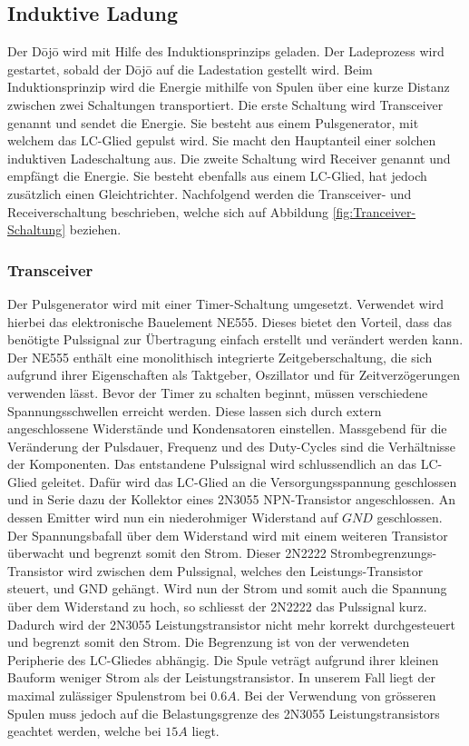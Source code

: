 \subsection{Induktive Ladung}\label{sec:energieuebertragung}

Der Dōjō wird mit Hilfe des Induktionsprinzips geladen. Der Ladeprozess wird gestartet, sobald der Dōjō auf die Ladestation gestellt wird. Beim Induktionsprinzip wird die Energie mithilfe von Spulen über eine kurze Distanz zwischen zwei Schaltungen transportiert. Die erste Schaltung wird Transceiver genannt und sendet die Energie. Sie besteht aus einem Pulsgenerator, mit welchem das LC-Glied gepulst wird. Sie macht den Hauptanteil einer solchen induktiven Ladeschaltung aus. Die zweite Schaltung wird Receiver genannt und empfängt die Energie. Sie besteht ebenfalls aus einem LC-Glied, hat jedoch zusätzlich einen Gleichtrichter. Nachfolgend werden die Transceiver- und Receiverschaltung beschrieben, welche sich auf Abbildung \ref{fig:Tranceiver-Schaltung} beziehen.

\subsubsection*{Transceiver}
Der Pulsgenerator wird mit einer Timer-Schaltung umgesetzt. Verwendet wird hierbei das elektronische Bauelement NE555. Dieses bietet den Vorteil, dass das benötigte Pulssignal zur Übertragung einfach erstellt und verändert werden kann. Der NE555 enthält eine monolithisch integrierte Zeitgeberschaltung, die sich aufgrund ihrer Eigenschaften als Taktgeber, Oszillator und für Zeitverzögerungen verwenden lässt. Bevor der Timer zu schalten beginnt, müssen verschiedene Spannungsschwellen erreicht werden. Diese lassen sich durch extern angeschlossene Widerstände und Kondensatoren einstellen. Massgebend für die Veränderung der Pulsdauer, Frequenz und des Duty-Cycles sind die Verhältnisse der Komponenten. Das entstandene Pulssignal wird schlussendlich an das LC-Glied geleitet. Dafür wird das LC-Glied an die Versorgungsspannung geschlossen und in Serie dazu der Kollektor eines 2N3055 NPN-Transistor angeschlossen. An dessen Emitter wird nun ein niederohmiger Widerstand auf $GND$ geschlossen. Der Spannungsbafall über dem Widerstand wird mit einem weiteren Transistor überwacht und begrenzt somit den Strom. Dieser {\glqq 2N2222 Strombegrenzungs-Transistor\grqq} wird zwischen dem Pulssignal, welches den Leistungs-Transistor steuert, und GND gehängt. Wird nun der Strom und somit auch die Spannung über dem Widerstand zu hoch, so schliesst der {\glqq 2N2222\grqq} das Pulssignal kurz. Dadurch wird der 2N3055 Leistungstransistor nicht mehr korrekt durchgesteuert und begrenzt somit den Strom. Die Begrenzung ist von der verwendeten Peripherie des LC-Gliedes abhängig. Die Spule veträgt aufgrund ihrer kleinen Bauform weniger Strom als der Leistungstransistor. In unserem Fall liegt der maximal zulässiger Spulenstrom bei $0.6A$. Bei der Verwendung von grösseren Spulen muss jedoch auf die Belastungsgrenze des 2N3055 Leistungstransistors geachtet werden, welche bei $15A$ liegt.

